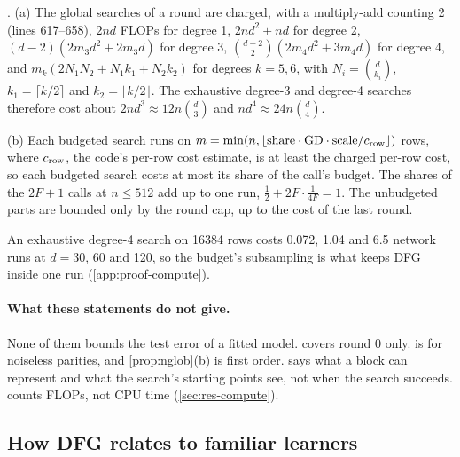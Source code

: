 \begin{proposition}[Compute; P5]\label{prop:compute}
. (a) The global searches of a round are charged, with a multiply-add counting 2 (lines 617--658), $2nd$ FLOPs for degree 1, $2nd^2+nd$ for degree 2, $(d-2)(2m_3d^2+2m_3d)$ for degree 3, $\binom{d-2}2(2m_4d^2+3m_4d)$ for degree 4, and $m_k(2N_1N_2+N_1k_1+N_2k_2)$ for degrees $k=5,6$, with $N_i=\binom d{k_i}$, $k_1=\lceil k/2\rceil$ and $k_2=\lfloor k/2\rfloor$. The exhaustive degree-3 and degree-4 searches therefore cost about $2nd^3\approx12n\binom d3$ and $nd^4\approx24n\binom d4$.

(b) Each budgeted search runs on $m=\min(n,\lfloor\text{share}\cdot\mathrm{GD}\cdot\text{scale}/c_{\rm row}\rfloor)$ rows, where $c_{\rm row}$, the code's per-row cost estimate, is at least the charged per-row cost, so each budgeted search costs at most its share of the call's budget. The shares of the $2F+1$ calls at $n\le512$ add up to one run, $\frac12+2F\cdot\frac1{4F}=1$. The unbudgeted parts are bounded only by the round cap, up to the cost of the last round.
\end{proposition}
An exhaustive degree-4 search on 16384 rows costs 0.072, 1.04 and 6.5 network runs at $d=30$, 60 and 120, so the budget's subsampling is what keeps DFG inside one run (\cref{app:proof-compute}).

\paragraph{What these statements do not give.} None of them bounds the test error of a fitted model.  covers round 0 only.  is for noiseless parities, and \cref{prop:nglob}(b) is first order.  says what a block can represent and what the search's starting points see, not when the search succeeds.  counts FLOPs, not CPU time (\cref{sec:res-compute}).

\subsection{How DFG relates to familiar learners}\label{sec:relates}

